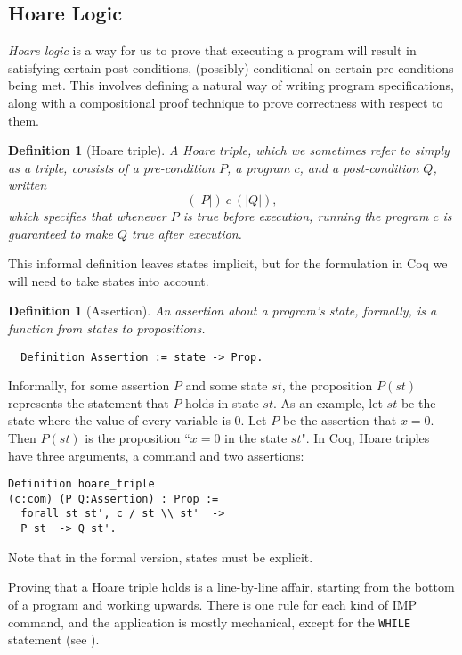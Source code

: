 \documentclass[compsoc,conference,a4paper,10pt,times]{IEEEtran}
\newtheorem{defin}[theorem]{Definition}
\begin{document}
\subsection{Hoare Logic}
\emph{Hoare logic} is a way for us to prove that executing a program will result in satisfying certain post-conditions, (possibly) conditional on certain pre-conditions being met.  This involves defining a natural way of writing program specifications, along with a compositional proof technique to prove correctness with respect to them.
\begin{defin}[Hoare triple]
	A \emph{Hoare triple}, which we sometimes refer to simply as a triple, consists of a pre-condition $P$, a program $c$, and a post-condition $Q$, written
    \[
    	(| P |)\ c\ (| Q |),
    \]
    which specifies that whenever $P$ is true before execution, running the program $c$ is guaranteed to make $Q$ true after execution.  
\end{defin}
This informal definition leaves states implicit, but for the formulation in Coq we will need to take states into account.

\begin{defin}[Assertion]
An \emph{assertion} about a program's state, formally, is a function from states to propositions.
\begin{verbatim}   
  Definition Assertion := state -> Prop.
\end{verbatim}
\end{defin}
Informally, for some assertion $P$ and some state $st$, the proposition $P(st)$ represents the statement that $P$ holds in state $st$.  
As an example, let $st$ be the state where the value of every variable is 0.  Let $P$ be the assertion that $x=0$.  Then $P(st)$ is the proposition ``$x = 0$ in the state $st$".  In Coq, Hoare triples have three arguments, a command and two assertions:
\begin{verbatim}
Definition hoare_triple 
(c:com) (P Q:Assertion) : Prop :=
  forall st st', c / st \\ st'  ->
  P st  -> Q st'.
\end{verbatim}
Note that in the formal version, states must be explicit.

Proving that a Hoare triple holds is a line-by-line affair, starting from the bottom of a program and working upwards.  There is one rule for each kind of IMP command, and the application is mostly mechanical, except for the \texttt{WHILE} statement (see \cite{SFV2}).
\end{document}

